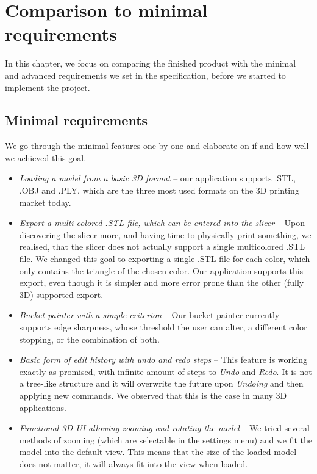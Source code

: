 \chapter{Comparison to minimal requirements}

In this chapter, we focus on comparing the finished product with the minimal and advanced requirements we set in the specification, before we started to implement the project.

\section{Minimal requirements}

We go through the minimal features one by one and elaborate on if and how well we achieved this goal.

\begin{itemize}
\item \textit{Loading a model from a basic 3D format} -- our application supports .STL, .OBJ and .PLY, which are the three most used formats on the 3D printing market today.

\item \textit{Export a multi-colored .STL file, which can be entered into the slicer} -- Upon discovering the slicer more, and having time to physically print something, we realised, that the slicer does not actually support a single multicolored .STL file. We changed this goal to exporting a single .STL file for each color, which only contains the triangle of the chosen color. Our application supports this export, even though it is simpler and more error prone than the other (fully 3D) supported export.

\item \textit{Bucket painter with a simple criterion} -- Our bucket painter currently supports edge sharpness, whose threshold the user can alter, a different color stopping, or the combination of both.

\item \textit{Basic form of edit history with undo and redo steps} -- This feature is working exactly as promised, with infinite amount of steps to \textit{Undo} and \textit{Redo}. It is not a tree-like structure and it will overwrite the future upon \textit{Undoing} and then applying new commands. We observed that this is the case in many 3D applications.

\item \textit{Functional 3D UI allowing zooming and rotating the model} -- We tried several methods of zooming (which are selectable in the settings menu) and we fit the model into the default view. This means that the size of the loaded model does not matter, it will always fit into the view when loaded.
\end{itemize}

